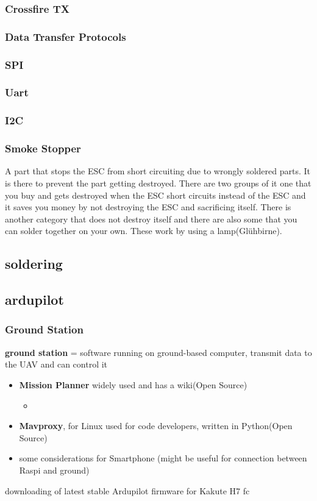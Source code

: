 \documentclass{article}
\begin{document}
	\subsubsection*{Crossfire TX}
	
	\subsubsection{Data Transfer Protocols}
	\subsubsection*{SPI}
	\subsubsection*{Uart}
	\subsubsection*{I2C}
	
	\subsubsection{Smoke Stopper}
	A part that stops the ESC from short circuiting due to wrongly soldered parts. It is there to prevent the part getting destroyed. There are two groups of it one that you buy and gets destroyed when the ESC short circuits instead of the ESC and it saves you money by not destroying the ESC and sacrificing itself. There is another category that does not destroy itself and there are also some that you can solder together on your own. These work by using a lamp(Glühbirne).
	
	
	
	\subsection{soldering}
	
	\subsection{ardupilot}
	\subsubsection{Ground Station}
	\textbf{ground station} = software running on ground-based computer, transmit data to the UAV and can control it
	\begin{itemize}
		\item \textbf{Mission Planner} \cite{MissionPlanner} widely used and has a wiki(Open Source)
		\begin{itemize}
			\item 
		\end{itemize}
		\item \textbf{Mavproxy}, for Linux used for code developers, written in Python(Open Source)
		\item some considerations for Smartphone (might be useful for connection between Raspi and ground)
	\end{itemize}
	downloading of latest stable Ardupilot firmware \cite{ArduPilotFirmware} for Kakute H7 fc	
	
\end{document}
